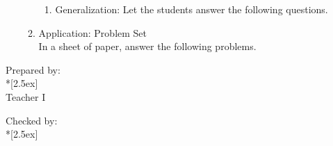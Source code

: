 \begin{enumerate}[label = \textbf{\Roman*. }]
\begin{enumerate}[label = \Alph*. ]
\begin{enumerate}[label = \arabic*. ]
		\item Generalization: 	Let the students answer the following questions. 
\begin{enumerate}[label = \arabic*. ]
\Generalization
\end{enumerate}

		\end{enumerate}


	\item Application: Problem Set\\ %
	In a sheet of paper, answer the following problems. \\
	{\PS}%

	\end{enumerate}

\end{enumerate}




\vfill

\begin{flushright}
Prepared by:\\*[2.5ex]
\Teacher \\
Teacher I
\end{flushright} 

\vspace*{3.5ex}

\begin{flushright}
Checked by:\\*[2.5ex]
\Checker
\end{flushright} 
	